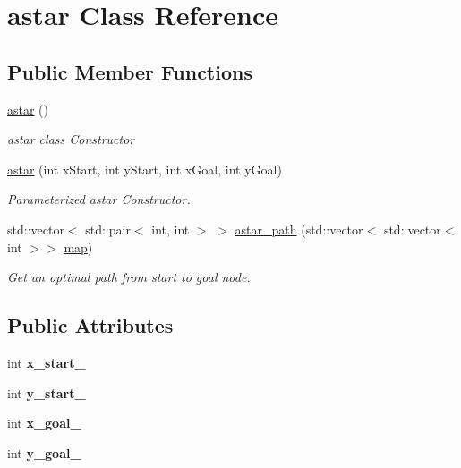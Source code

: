 \hypertarget{classastar}{}\section{astar Class Reference}
\label{classastar}
\subsection*{Public Member Functions}
\begin{DoxyCompactItemize}
\item 
\hyperlink{classastar_a808c2fae9494ae43181c00fc82faa66e}{astar} ()
\begin{DoxyCompactList}\small\item\em astar class Constructor \end{DoxyCompactList}\item 
\hyperlink{classastar_ad0c911baec7de8b797509a3ace9f571a}{astar} (int x\+Start, int y\+Start, int x\+Goal, int y\+Goal)
\begin{DoxyCompactList}\small\item\em Parameterized astar Constructor. \end{DoxyCompactList}\item 
std\+::vector$<$ std\+::pair$<$ int, int $>$ $>$ \hyperlink{classastar_a2b425e6ef0bbaee997d2d05d87261b3c}{astar\+\_\+path} (std\+::vector$<$ std\+::vector$<$ int $>$$>$ \hyperlink{classmap}{map})
\begin{DoxyCompactList}\small\item\em Get an optimal path from start to goal node. \end{DoxyCompactList}\end{DoxyCompactItemize}
\subsection*{Public Attributes}
\begin{DoxyCompactItemize}
\item 
int {\bfseries x\+\_\+start\+\_\+}\hypertarget{classastar_addb5a0935d9faf28cf2816c45e6312b0}{}\label{classastar_addb5a0935d9faf28cf2816c45e6312b0}

\item 
int {\bfseries y\+\_\+start\+\_\+}\hypertarget{classastar_acd09db0a6c516e3656f4d4d2b092eced}{}\label{classastar_acd09db0a6c516e3656f4d4d2b092eced}

\item 
int {\bfseries x\+\_\+goal\+\_\+}\hypertarget{classastar_a7660617c137c37d9771a98a5e0754b8e}{}\label{classastar_a7660617c137c37d9771a98a5e0754b8e}

\item 
int {\bfseries y\+\_\+goal\+\_\+}\hypertarget{classastar_a230f8569c910a1c6b0de9c654b5dd9b5}{}\label{classastar_a230f8569c910a1c6b0de9c654b5dd9b5}

\end{DoxyCompactItemize}
